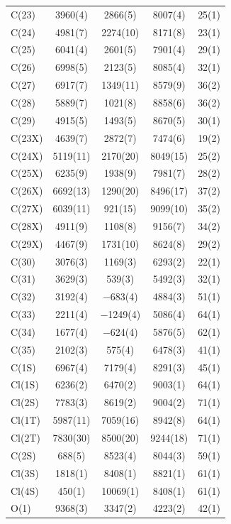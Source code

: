 \begin{center}
{\begin{supertabular}{lcccc}
C(23)&3960(4)&2866(5)&8007(4)&25(1)\\
C(24)&4981(7)&2274(10)&8171(8)&23(1)\\
C(25)&6041(4)&2601(5)&7901(4)&29(1)\\
C(26)&6998(5)&2123(5)&8085(4)&32(1)\\
C(27)&6917(7)&1349(11)&8579(9)&36(2)\\
C(28)&5889(7)&1021(8)&8858(6)&36(2)\\
C(29)&4915(5)&1493(5)&8670(5)&30(1)\\
C(23X)&4639(7)&2872(7)&7474(6)&19(2)\\
C(24X)&5119(11)&2170(20)&8049(15)&25(2)\\
C(25X)&6235(9)&1938(9)&7981(7)&28(2)\\
C(26X)&6692(13)&1290(20)&8496(17)&37(2)\\
C(27X)&6039(11)&921(15)&9099(10)&35(2)\\
C(28X)&4911(9)&1108(8)&9156(7)&34(2)\\
C(29X)&4467(9)&1731(10)&8624(8)&29(2)\\
C(30)&3076(3)&1169(3)&6293(2)&22(1)\\
C(31)&3629(3)&539(3)&5492(3)&32(1)\\
C(32)&3192(4)&$-$683(4)&4884(3)&51(1)\\
C(33)&2211(4)&$-$1249(4)&5086(4)&64(1)\\
C(34)&1677(4)&$-$624(4)&5876(5)&62(1)\\
C(35)&2102(3)&575(4)&6478(3)&41(1)\\
C(1S)&6967(4)&7179(4)&8291(3)&45(1)\\
Cl(1S)&6236(2)&6470(2)&9003(1)&64(1)\\
Cl(2S)&7783(3)&8619(2)&9004(2)&71(1)\\
Cl(1T)&5987(11)&7059(16)&8942(8)&64(1)\\
Cl(2T)&7830(30)&8500(20)&9244(18)&71(1)\\
C(2S)&688(5)&8523(4)&8044(3)&59(1)\\
Cl(3S)&1818(1)&8408(1)&8821(1)&61(1)\\
Cl(4S)&450(1)&10069(1)&8408(1)&61(1)\\
O(1)&9368(3)&3347(2)&4223(2)&42(1)\\
\end{supertabular}
}
\end{center}


